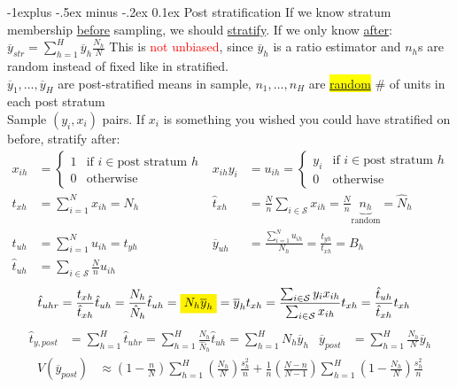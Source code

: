 \documentclass[landscape]{article}
\makeatletter
\renewcommand{\subsection}{\@startsection{subsection}{2}{0mm}%
                                {-1explus -.5ex minus -.2ex}%
                                {0.1ex}%
                                {\color{orange}\normalfont\normalsize\bfseries}}
\makeatother
\begin{document}
\begin{multicols*}{3}
\subsection{Post stratification} If we know stratum membership
\underline{before} sampling, we should \underline{stratify}. If we
only know \underline{after}:
 $ \overline{y}_{str} = \sum_{h=1}^{H}\overline{y}_h \frac{N_h}{N}$
This is \textcolor{red}{not unbiased}, since $\overline{y}_h$ is a ratio estimator and
$n_h$s are random instead of fixed like in stratified.
\\ $\overline{y}_1, \ldots, \overline{y}_H$ are post-stratified means
in sample, $n_1 , \ldots , n_H$ are
\colorbox{yellow}{\underline{random}} \# of units in each post stratum
\\ Sample $(y_i, x_i)$ pairs. If $x_i$ is something you wished you
could have stratified on before, stratify after:
\begin{align*}
  x_{ih} & =
           \begin{cases}
             1 & \text{if } i \in \text{post stratum }h
             \\ 0 & \text{otherwise}
           \end{cases}
  & x_{ih}y_i & = u_{ih} =
                 \begin{cases}
                   y_i & \text{if } i \in \text{post stratum }h
                   \\ 0 & \text{otherwise}
                 \end{cases}
  \\ t_{xh} & = \sum_{i=1}^N x_{ih} = N_h
  & \hat{t}_{xh} & = \frac{N}{n} \sum_{i \in \mathcal{S}} x_{ih} = \frac{N}{n} \underbrace{n_h}_{\text{random}} = \hat{N}_h
  \\ t_{uh} & = \sum_{i=1}^N u_{ih} = t_{yh}
  & \overline{y}_{uh} & = \frac{\sum_{i=1}^N u_{ih}}{N_h} = \frac{t_{yh}}{t_{xh}} = B_h
  \\ \hat{t}_{uh} & = \sum_{i \in \mathcal{S}} \frac{N}{n}u_{ih}
\end{align*}
\begin{align*}
   \hat{t}_{uhr} & = \frac{t_{xh}}{\hat{t}_{xh}}\hat{t}_{uh} = \frac{N_h}{\hat{N}_h}\hat{t}_{uh} = \colorbox{yellow}{$N_h \overline{y}_h$}
                   = {\overline{y}_h}t_{xh}= \frac{\sum_{i\in \mathcal{S}}y_ix_{ih}}{\sum_{i \in \mathcal{S}}x_{ih}} t_{xh} = \frac{\hat{t}_{uh}}{\hat{t}_{xh}} t_{xh}
\end{align*}
\begin{align*}
  \hat{t}_{y,post} & = \sum_{h=1}^{H}\hat{t}_{uhr} = \sum_{h=1}^{H}\frac{N_h}{\hat{N}_h} \hat{t}_{uh} = \sum_{h=1}^{H}N_h \overline{y}_h
  & \overline{y}_{post} & = \sum_{h=1}^{H}\frac{N_h}{N} \overline{y}_h
\end{align*}
\begin{align*}
  V(\overline{y}_{post}) & \approx \left(1 - \frac{n}{N}\right) \sum_{h=1}^{H} \left(\frac{N_h}{N}\right) \frac{s_h^2}{n} + \frac{1}{n} \left(\frac{N-n}{N-1}\right) \sum_{h=1}^{H} \left(1 - \frac{N_h}{N}\right) \frac{s_h^2}{n}
\end{align*}

\end{multicols*}
\end{document}
